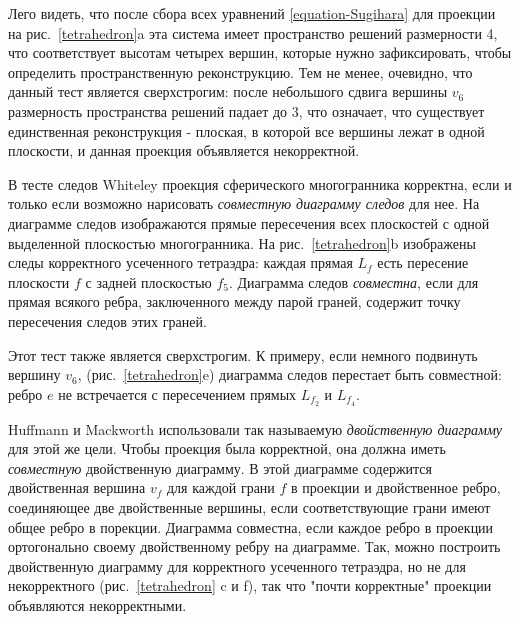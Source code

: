 \documentclass[a4paper,12pt, titlepage]{article}
\begin{document}
\begin{flushleft}
      Лего видеть, что после сбора всех уравнений \ref{equation-Sugihara} для проекции на
рис.~\ref{tetrahedron}a эта система имеет пространство решений размерности 4, что
соответствует высотам четырех вершин, которые нужно зафиксировать, чтобы определить 
пространственную реконструкцию. Тем не менее, очевидно, что данный тест является сверхстрогим:
после небольшого сдвига вершины $v_{6}$ размерность пространства решений падает до 3, что
означает, что существует единственная реконструкция - плоская, в которой все вершины лежат в
одной плоскости, и данная проекция объявляется некорректной.
\end{flushleft}

\begin{flushleft}
      В тесте следов Whiteley \cite{Whiteley-2} проекция сферического многогранника корректна,
если и только если возможно нарисовать \textit{совместную диаграмму следов} для нее. На
диаграмме следов изображаются прямые пересечения всех плоскостей с одной выделенной плоскостью
многогранника. На рис.~\ref{tetrahedron}b изображены следы корректного усеченного тетраэдра:
каждая прямая $L_{f}$ есть пересение плоскости $f$ с задней плоскостью $f_{5}$. Диаграмма следов
\textit{совместна}, если для прямая всякого ребра, заключенного между парой граней, содержит
точку пересечения следов этих граней.
\end{flushleft}

\begin{flushleft}
      Этот тест также является сверхстрогим. К примеру, если немного подвинуть вершину $v_{6}$,
(рис.~\ref{tetrahedron}e) диаграмма следов перестает быть совместной: ребро $e$ не встречается
с пересечением прямых $L_{f_{2}}$ и $L_{f_{4}}$.
\end{flushleft}

\begin{flushleft}
      Huffmann \cite{Huffmann} и Mackworth \cite{Mackworth} использовали так называемую 
\textit{двойственную диаграмму} для этой же цели. Чтобы проекция была корректной, она должна
иметь \textit{совместную} двойственную диаграмму. В этой диаграмме содержится двойственная
вершина $v_{f}$ для каждой грани $f$ в проекции и двойственное ребро, соединяющее две двойственные
вершины, если соответствующие грани имеют общее ребро в порекции. Диаграмма совместна, если 
каждое ребро в проекции ортогонально своему двойственному ребру на диаграмме. Так, можно построить 
двойственную диаграмму для корректного усеченного тетраэдра, но не для некорректного 
(рис.~\ref{tetrahedron} c и f), так что "почти корректные" проекции объявляются некорректными.
\end{flushleft}
\end{document}
